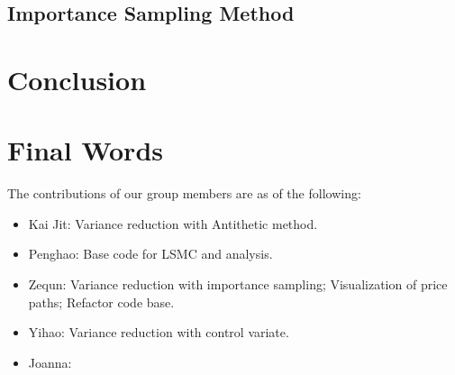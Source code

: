 \documentclass[12pt]{article}
\begin{document}
\subsection{Importance Sampling Method}

\section{Conclusion}

\section{Final Words}

The contributions of our group members are as of the following:
\begin{itemize}
\item Kai Jit: Variance reduction with Antithetic method.
\item Penghao: Base code for LSMC and analysis.
\item Zequn: Variance reduction with importance sampling; Visualization of price paths; Refactor code base.
\item Yihao: Variance reduction with control variate.
\item Joanna:
\end{itemize}

\printbibliography
\end{document}

